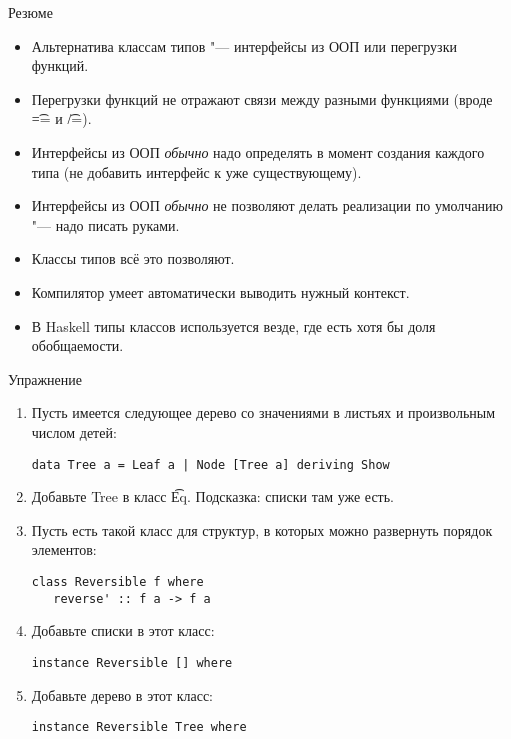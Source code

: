 \begin{frame}[fragile]{Резюме}
	\begin{itemize}
		\item Альтернатива классам типов "--- интерфейсы из ООП или перегрузки функций.
		\item Перегрузки функций не отражают связи между разными функциями (вроде \t{==} и \t{/=}).
		\item Интерфейсы из ООП \textit{обычно} надо определять в момент создания каждого типа (не добавить интерфейс к уже существующему).
		\item Интерфейсы из ООП \textit{обычно} не позволяют делать реализации по умолчанию "--- надо писать руками.
		\item Классы типов всё это позволяют.
		\item Компилятор умеет автоматически выводить нужный контекст.
		\item В Haskell типы классов используется везде, где есть хотя бы доля обобщаемости.
	\end{itemize}
\end{frame}

\begin{frame}[fragile]{Упражнение}
	\begin{enumerate}
		\item Пусть имеется следующее дерево со значениями в листьях и произвольным числом детей:
\begin{verbatim}
data Tree a = Leaf a | Node [Tree a] deriving Show
\end{verbatim}
		\item Добавьте Tree в класс \t{Eq}. Подсказка: списки там уже есть.
		\item Пусть есть такой класс для структур, в которых можно развернуть порядок элементов:
\begin{verbatim}
class Reversible f where
   reverse' :: f a -> f a
\end{verbatim}
		\item Добавьте списки в этот класс:
\begin{verbatim}
instance Reversible [] where
\end{verbatim}
		\item Добавьте дерево в этот класс:
\begin{verbatim}
instance Reversible Tree where
\end{verbatim}
	\end{enumerate}
\end{frame}
